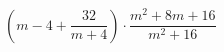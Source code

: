 \begin{ex}[type=expression]
	\begin{condition}
		\( \left( m-4+\dfrac{32}{m+4} \right) \cdot\dfrac{m^2+8m+16}{m^2+16}\)
	\end{condition}
\end{ex}